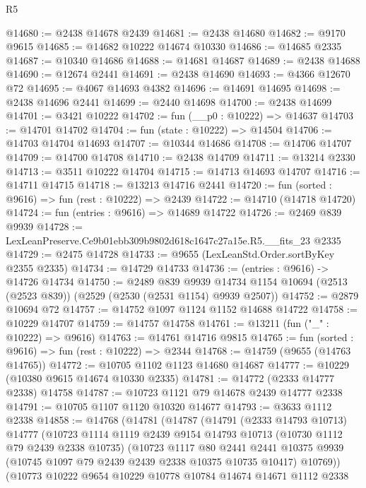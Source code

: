 \begin{lexlean}{R5}
\begin{coremodule}
@14680 := @2438 @14678 @2439
@14681 := @2438 @14680
@14682 := @9170 @9615
@14685 := @14682 @10222 @14674 @10330
@14686 := @14685 @2335
@14687 := @10340 @14686
@14688 := @14681 @14687
@14689 := @2438 @14688
@14690 := @12674 @2441
@14691 := @2438 @14690
@14693 := @4366 @12670 @72
@14695 := @4067 @14693 @4382
@14696 := @14691 @14695
@14698 := @2438 @14696 @2441
@14699 := @2440 @14698
@14700 := @2438 @14699
@14701 := @3421 @10222
@14702 := fun (__p0 : @10222) => @14637
@14703 := @14701 @14702
@14704 := fun (state : @10222) => @14504
@14706 := @14703 @14704 @14693
@14707 := @10344 @14686
@14708 := @14706 @14707
@14709 := @14700 @14708
@14710 := @2438 @14709
@14711 := @13214 @2330
@14713 := @3511 @10222 @14704
@14715 := @14713 @14693 @14707
@14716 := @14711 @14715
@14718 := @13213 @14716 @2441
@14720 := fun (sorted : @9616) => fun (rest : @10222) => @2439
@14722 := @14710 (@14718 @14720)
@14724 := fun (entries : @9616) => @14689 @14722
@14726 := @2469 @839 @9939
@14728 := LexLeanPreserve.Ce9b01ebb309b9802d618c1647c27a15e.R5.__fits_23 @2335
@14729 := @2475 @14728
@14733 := @9655 (LexLeanStd.Order.sortByKey @2355 @2335)
@14734 := @14729 @14733
@14736 := (entries : @9616) -> @14726 @14734
@14750 := @2489
    @839
    @9939
    @14734
    @1154
    @10694
    (@2513 (@2523 @839))
    (@2529 (@2530 (@2531 @1154) @9939 @2507))
@14752 := @2879 @10694 @72
@14757 := @14752 @1097 @1124 @1152 @14688 @14722
@14758 := @10229 @14707
@14759 := @14757 @14758
@14761 := @13211 (fun ("_" : @10222) => @9616)
@14763 := @14761 @14716 @9815
@14765 := fun (sorted : @9616) => fun (rest : @10222) => @2344
@14768 := @14759 (@9655 (@14763 @14765))
@14772 := @10705 @1102 @1123 @14680 @14687
@14777 := @10229 (@10380 @9615 @14674 @10330 @2335)
@14781 := @14772 (@2333 @14777 @2338) @14758
@14787 := @10723 @1121 @79 @14678 @2439 @14777 @2338
@14791 := @10705 @1107 @1120 @10320 @14677
@14793 := @3633 @1112 @2338
@14858 := @14768
    (@14781
      (@14787
        (@14791
          (@2333 @14793 @10713)
          @14777
          (@10723
            @1114
            @1119
            @2439
            @9154
            @14793
            @10713
            (@10730 @1112 @79 @2439 @2338 @10735)
            (@10723
              @1117
              @80
              @2441
              @2441
              @10375
              @9939
              (@10745 @1097 @79 @2439 @2439 @2338 @10375 @10735 @10417)
              @10769))
          (@10773
            @10222
            @9654
            @10229
            @10778
            @10784
            @14674
            @14671
            @1112
            @2338

\end{coremodule}
\end{lexlean}
